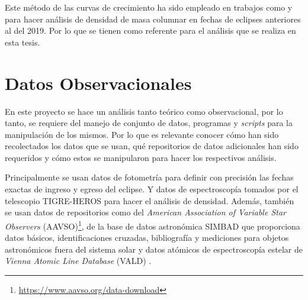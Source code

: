 \documentclass[12pt,oneside,openany,letter]{book}
\begin{document}

Este método de las curvas de crecimiento ha sido empleado en trabajos como \citep{kps1O} y \citep{wilson1954chromospheric} para hacer análisis de densidad de masa columnar en fechas de eclipses anteriores al del 2019. Por lo que se tienen como referente para el análisis que se realiza en esta tesis.





\chapter{Datos Observacionales}  \label{cap:datos_obs}

En este proyecto se hace un análisis tanto teórico como observacional, por lo tanto, se requiere del manejo de conjunto de datos, programas y \textit{scripts} para la manipulación de los mismos. Por lo que es relevante conocer cómo han sido recolectados los datos que se usan, qué repositorios de datos adicionales han sido requeridos y cómo estos se manipularon para hacer los respectivos análisis.

\noindent Principalmente se usan datos de fotometría para definir con precisión las fechas exactas de ingreso y egreso del eclipse. Y datos de espectroscopía tomados por el telescopio TIGRE-HEROS para hacer el análisis de densidad. Además, también se usan datos de repositorios como del \textit{American Association of Variable Star Observers} (AAVSO)\footnote{\url{https://www.aavso.org/data-download}}, de la base de datos astronómica SIMBAD que proporciona datos básicos, identificaciones cruzadas, bibliografía y mediciones para objetos astronómicos fuera del sistema solar y datos atómicos de espectroscopía estelar de \textit{Vienna Atomic Line Database} (VALD) \citep{piskunov1995vald}.
\end{document}
